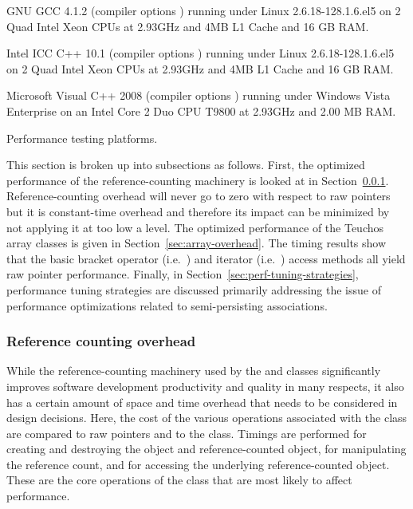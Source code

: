 \documentclass[pdf,ps2pdf,11pt]{SANDreport}
\begin{document}
\begin{table}
\begin{description}
%
{}\item[GCC 4.1.2:] GNU GCC 4.1.2 (compiler options {}) running under Linux 2.6.18-128.1.6.el5
on 2 Quad Intel Xeon CPUs at 2.93GHz and 4MB L1 Cache and 16 GB RAM.
%
{}\item[ICC 10.1:] Intel ICC C++ 10.1 (compiler options {}) running under Linux 2.6.18-128.1.6.el5
on 2 Quad Intel Xeon CPUs at 2.93GHz and 4MB L1 Cache and 16 GB RAM.
%
{}\item[MSVC++ 2008:] Microsoft Visual C++ 2008 (compiler options
{})
running under Windows Vista Enterprise on an Intel Core 2 Duo CPU
T9800 at 2.93GHz and 2.00 MB RAM.
%
\end{description}
\caption{\label{tbl:PerfTestPlatforms}
Performance testing platforms.}
\end{table}

This section is broken up into subsections as follows.  First, the
optimized performance of the reference-counting machinery is looked at
in Section~\ref{sec:reference-counting-overhead}.  Reference-counting
overhead will never go to zero with respect to raw pointers but it is
constant-time overhead and therefore its impact can be minimized by
not applying it at too low a level.  The optimized performance of the
Teuchos array classes is given in Section~\ref{sec:array-overhead}.
The timing results show that the basic bracket operator (i.e.\
{}) and iterator (i.e.\ {}) access methods
all yield raw pointer performance.  Finally, in
Section~\ref{sec:perf-tuning-strategies}, performance tuning
strategies are discussed primarily addressing the issue of performance
optimizations related to semi-persisting associations.


%
{}\subsubsection{Reference counting overhead}
\label{sec:reference-counting-overhead}
%

While the reference-counting machinery used by the {} and
{}\ttt{ArrayRCP} classes significantly improves software
development productivity and quality in many respects, it also has a
certain amount of space and time overhead that needs to be considered
in design decisions.  Here, the cost of the various operations
associated with the {} class are compared to raw pointers
and to the {}\ttt{boost::shared\_ptr} class.  Timings are performed
for creating and destroying the {}\ttt{RCPNode} object and
reference-counted object, for manipulating the reference count, and
for accessing the underlying reference-counted object.  These are the
core operations of the {}\ttt{RCP} class that are most likely to
affect performance.
\end{document}
